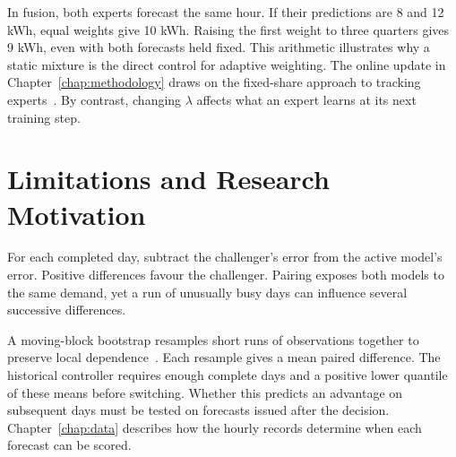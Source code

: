 In fusion, both experts forecast the same hour. If their predictions are 8 and 12 kWh, equal weights give 10 kWh. Raising the first weight to three quarters gives 9 kWh, even with both forecasts held fixed. This arithmetic illustrates why a static mixture is the direct control for adaptive weighting. The online update in Chapter~\ref{chap:methodology} draws on the fixed-share approach to tracking experts~\cite{herbster1998}. By contrast, changing $\lambda$ affects what an expert learns at its next training step.

\section{Limitations and Research Motivation}

For each completed day, subtract the challenger's error from the active model's error. Positive differences favour the challenger. Pairing exposes both models to the same demand, yet a run of unusually busy days can influence several successive differences.

A moving-block bootstrap resamples short runs of observations together to preserve local dependence~\cite{kunsch1989}. Each resample gives a mean paired difference. The historical controller requires enough complete days and a positive lower quantile of these means before switching. Whether this predicts an advantage on subsequent days must be tested on forecasts issued after the decision. Chapter~\ref{chap:data} describes how the hourly records determine when each forecast can be scored.
